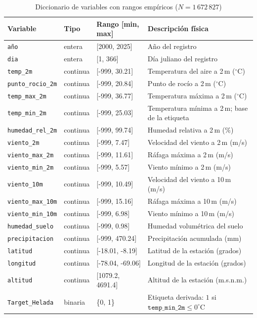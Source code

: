 \begin{table}[H]
\centering
\caption{Diccionario de variables con rangos empíricos ($N=1\,672\,827$)}
\label{tab:dict}
\scriptsize
\renewcommand{\arraystretch}{1.15}
\begin{tabular}{p{1.9cm}p{0.7cm}p{1.9cm}p{2.2cm}}
\toprule
\textbf{Variable} & \textbf{Tipo} & \textbf{Rango [min, max]} & \textbf{Descripción física} \\
\midrule
\texttt{año} & entera & [2000, 2025] & Año del registro \\
\texttt{dia} & entera & [1, 366] & Día juliano del registro \\
\texttt{temp\_2m} & continua & [-999, 30.21] & Temperatura del aire a 2\,m ($^\circ$C) \\
\texttt{punto\_rocio\_2m} & continua & [-999, 20.84] & Punto de rocío a 2\,m ($^\circ$C) \\
\texttt{temp\_max\_2m} & continua & [-999, 36.77] & Temperatura máxima a 2\,m ($^\circ$C) \\
\texttt{temp\_min\_2m} & continua & [-999, 25.03] & Temperatura mínima a 2\,m; base de la etiqueta \\
\texttt{humedad\_rel\_2m} & continua & [-999, 99.74] & Humedad relativa a 2\,m (\%) \\
\texttt{viento\_2m} & continua & [-999, 7.47] & Velocidad del viento a 2\,m (m/s) \\
\texttt{viento\_max\_2m} & continua & [-999, 11.61] & Ráfaga máxima a 2\,m (m/s) \\
\texttt{viento\_min\_2m} & continua & [-999, 5.57] & Viento mínimo a 2\,m (m/s) \\
\texttt{viento\_10m} & continua & [-999, 10.49] & Velocidad del viento a 10\,m (m/s) \\
\texttt{viento\_max\_10m} & continua & [-999, 15.16] & Ráfaga máxima a 10\,m (m/s) \\
\texttt{viento\_min\_10m} & continua & [-999, 6.98] & Viento mínimo a 10\,m (m/s) \\
\texttt{humedad\_suelo} & continua & [-999, 0.98] & Humedad volumétrica del suelo \\
\texttt{precipitacion} & continua & [-999, 470.24] & Precipitación acumulada (mm) \\
\texttt{latitud} & continua & [-18.01, -8.19] & Latitud de la estación (grados) \\
\texttt{longitud} & continua & [-78.04, -69.06] & Longitud de la estación (grados) \\
\texttt{altitud} & continua & [1079.2, 4691.4] & Altitud de la estación (m.s.n.m.) \\
\midrule
\texttt{Target\_Helada} & binaria & \{0, 1\} & Etiqueta derivada: $1$ si $\texttt{temp\_min\_2m}\le 0^\circ$C \\
\bottomrule
\end{tabular}
\end{table}


